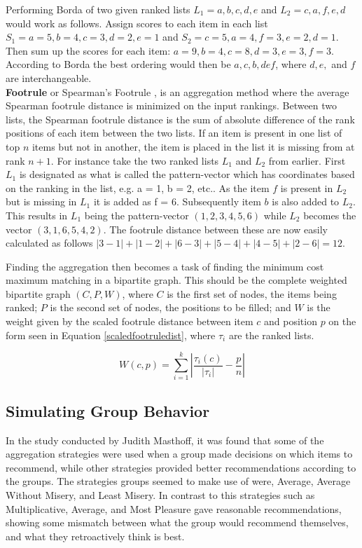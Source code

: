 Performing Borda of two given ranked lists $L_{1} = {a,b,c,d,e}$ and $L_{2} = {c,a,f,e,d}$ would work as follows. Assign scores to each item in each list $S_{1} = {a = 5, b = 4, c = 3, d = 2, e = 1}$ and $S_{2} = {c = 5, a = 4, f = 3, e = 2, d = 1}$. Then sum up the scores for each item: $a = 9, b = 4, c = 8, d = 3, e = 3, f = 3$. According to Borda the best ordering would then be ${a, c, b, def}$, where $d, e,$ and $f$ are interchangeable.\\


\textbf{Footrule} or Spearman’s Footrule \cite{baltrunas}, is an aggregation method where the average Spearman footrule distance is minimized on the input rankings.
Between two lists, the Spearman footrule distance is the sum of absolute difference of the rank positions of each item between the two lists. If an item is present in one list of top $n$ items but not in another, the item is placed in the list it is missing from at rank $n + 1$.
For instance take the two ranked lists $L_{1}$ and $L_{2}$ from earlier. First $L_{1}$ is designated as what is called the pattern-vector which has coordinates based on the ranking in the list, e.g. a = 1, b = 2, etc.. As the item $f$ is present in $L_{2}$ but is missing in $L_{1}$ it is added as f = 6. Subsequently item $b$ is also added to $L_{2}$. This results in $L_{1}$ being the pattern-vector $(1,2,3,4,5,6)$ while $L_{2}$ becomes the vector $(3,1,6,5,4,2)$. The footrule distance between these are now easily calculated as follows $|3-1| + |1-2| + |6-3| + |5-4| + |4-5| + |2-6| = 12$.

Finding the aggregation then becomes a task of finding the minimum cost maximum matching in a bipartite graph. This should be the complete weighted bipartite graph $(C, P, W)$, where $C$ is the first set of nodes, the items being ranked; $P$ is the second set of nodes, the positions to be filled; and $W$ is the weight given by the scaled footrule distance between item $c$ and position $p$ on the form seen in Equation \ref{scaledfootruledist}, where $\tau_{i}$ are the ranked lists.

\begin{equation} \label{scaledfootruledist}
	W(c,p) = \sum_{i=1}^{k} \left | \frac{\tau_{i}(c)}{\left |\tau_{i}  \right |} - \frac{p}{n} \right |
\end{equation}

\subsection{Simulating Group Behavior} \label{bg:aggregation:groupbehavior}
In the study conducted by Judith Masthoff, it was found that some of the aggregation strategies were used when a group made decisions on which items to recommend, while other strategies provided better recommendations according to the groups. The strategies groups seemed to make use of were, Average, Average Without Misery, and Least Misery. In contrast to this strategies such as Multiplicative, Average, and Most Pleasure gave reasonable recommendations, showing some mismatch between what the group would recommend themselves, and what they retroactively think is best.

